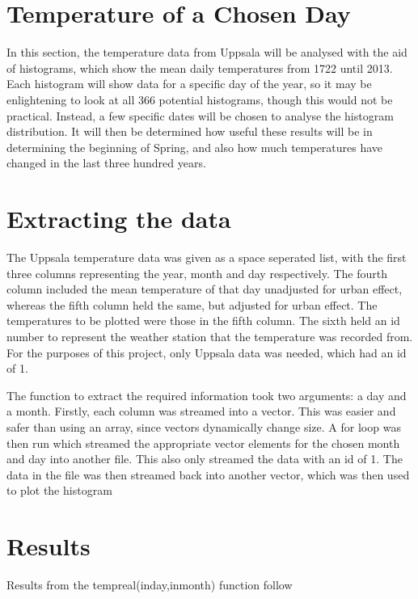 \documentclass[a4paper,10pt,oneside]{article}
\author{Cameron Robertson}
\date{11/09/17}
\begin{document}
\section{Temperature of a Chosen Day}
\label{sec:intro}

 In this section, the temperature
data from Uppsala will be analysed with the aid of histograms, which show the mean daily
temperatures from 1722 until 2013. Each histogram will show data for a specific day of the year,
so it may be enlightening to look at all 366 potential histograms, though this would
not be practical. Instead, a few specific dates will be chosen to analyse the histogram
distribution. It will then be determined how useful these results will be in determining the beginning
of Spring, and also how much temperatures have changed in the last three hundred years.

\section{Extracting the data}
\label{sec:data}

The Uppsala temperature data was given as a space seperated list, with the first three
columns representing the year, month and day respectively. The fourth column included the mean
temperature of that day unadjusted for urban effect, whereas the fifth column held
the same, but adjusted for urban effect. The temperatures to be plotted were those 
in the fifth column. The sixth held an id number to represent the weather station
that the temperature was recorded from. For the purposes of this project, only Uppsala
data was needed, which had an id of 1.

The function to extract the required information took two arguments: a day and a month. Firstly, each column was streamed into a vector. This was
easier and safer than using an array, since vectors dynamically change size. A for loop was then run which streamed the appropriate vector elements for the
chosen month and day into another file. This also only streamed the data with an id of 1. The data in the file was then streamed back into another
vector, which was then used to plot the histogram

\section{Results}
\label{sec:res}

Results from the tempreal(inday,inmonth) function follow
\end{document}
